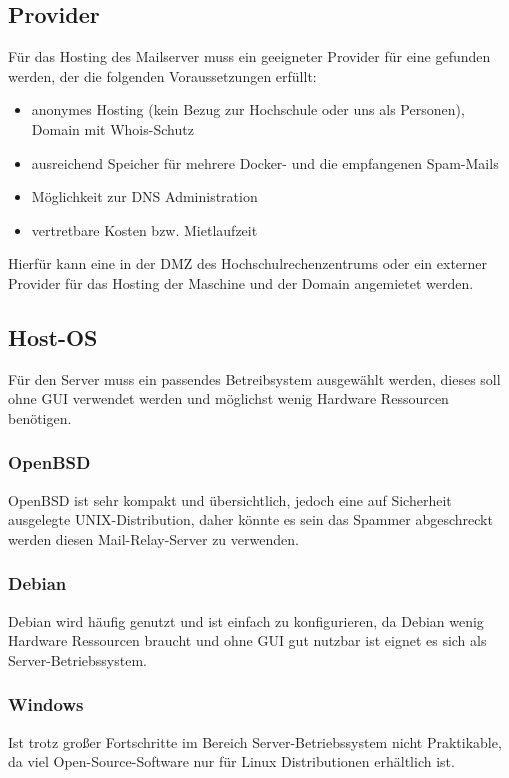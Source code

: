 \documentclass[a4paper,11pt,singlespacing]{article}
\begin{document}
	\subsection{Provider}\label{sec:Provider}
		Für das Hosting des Mailserver  muss ein geeigneter Provider für eine  gefunden werden, der die folgenden Voraussetzungen erfüllt:
		\begin{itemize}
		    \item anonymes Hosting (kein Bezug zur Hochschule oder uns als Personen), Domain mit Whois-Schutz
			\item ausreichend Speicher für mehrere Docker- und die empfangenen Spam-Mails
			\item Möglichkeit zur DNS Administration
			\item vertretbare Kosten bzw. Mietlaufzeit
		\end{itemize}
		
		Hierfür kann eine  in der DMZ des Hochschulrechenzentrums oder ein externer Provider für das Hosting der Maschine und der Domain angemietet werden.

	\subsection{Host-OS}\label{sec:Host-Maschine}
		Für den Server muss ein passendes Betreibsystem ausgewählt werden, dieses soll ohne GUI verwendet werden und möglichst wenig Hardware Ressourcen benötigen.
		\subsubsection{OpenBSD}\label{sec:OpenBSD}
			OpenBSD ist sehr kompakt und übersichtlich, jedoch eine auf Sicherheit ausgelegte UNIX-Distribution, daher könnte es sein das Spammer abgeschreckt werden diesen Mail-Relay-Server zu verwenden.
		\subsubsection{Debian}\label{sec:Debian}
			Debian wird häufig genutzt und ist einfach zu konfigurieren, da Debian wenig Hardware Ressourcen braucht und ohne GUI gut nutzbar ist eignet es sich als Server-Betriebssystem.
		\subsubsection{Windows}\label{sec:Windows}
			Ist trotz gro{\ss}er Fortschritte im Bereich Server-Betriebssystem nicht Praktikable, da viel Open-Source-Software nur für Linux Distributionen erhältlich ist.
\end{document}
